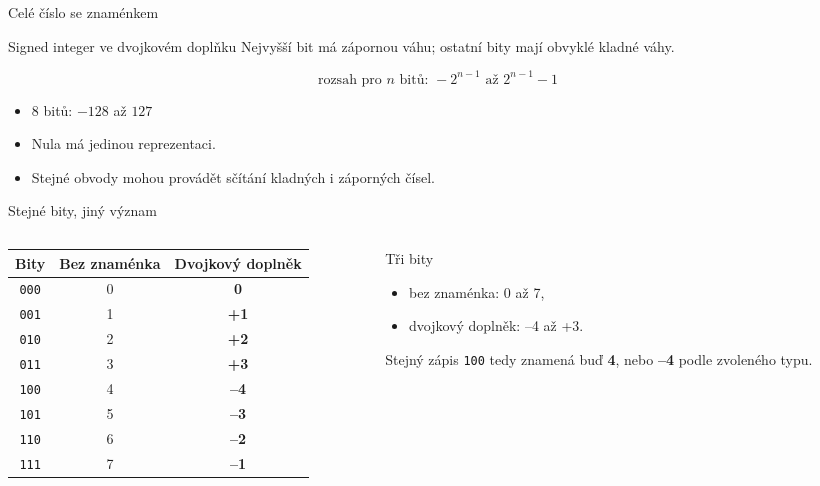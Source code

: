 \documentclass[aspectratio=169]{beamer}
\begin{document}
\begin{frame}{Celé číslo se znaménkem}
  \begin{block}{Signed integer ve dvojkovém doplňku}
    Nejvyšší bit má zápornou váhu; ostatní bity mají obvyklé kladné váhy.
  \end{block}
  \[
    \text{rozsah pro } n \text{ bitů: } -2^{n-1} \text{ až } 2^{n-1}-1
  \]
  \begin{itemize}
    \item 8 bitů: $-128$ až $127$
    \item Nula má jedinou reprezentaci.
    \item Stejné obvody mohou provádět sčítání kladných i záporných čísel.
  \end{itemize}
\end{frame}

\begin{frame}{Stejné bity, jiný význam}
  \begin{columns}[T,onlytextwidth]
    \begin{column}{0.58\textwidth}
      \centering
      \renewcommand{\arraystretch}{1.15}
      \begin{tabular}{c|c|c}
        \textbf{Bity} & \textbf{Bez znaménka} & \textbf{Dvojkový doplněk} \\
        \hline
        \texttt{000} & 0 & \textbf{0} \\
        \texttt{001} & 1 & \textbf{+1} \\
        \texttt{010} & 2 & \textbf{+2} \\
        \texttt{011} & 3 & \textbf{+3} \\
        \hline
        \texttt{100} & 4 & \textbf{--4} \\
        \texttt{101} & 5 & \textbf{--3} \\
        \texttt{110} & 6 & \textbf{--2} \\
        \texttt{111} & 7 & \textbf{--1} \\
      \end{tabular}
    \end{column}
    \begin{column}{0.37\textwidth}
      \begin{block}{Tři bity}
        \begin{itemize}
          \item bez znaménka: 0 až 7,
          \item dvojkový doplněk: --4 až +3.
        \end{itemize}
      \end{block}
      \vspace{3mm}
      Stejný zápis \texttt{100} tedy znamená buď \textbf{4}, nebo \textbf{--4} podle zvoleného typu.
    \end{column}
  \end{columns}
\end{frame}
\end{document}

